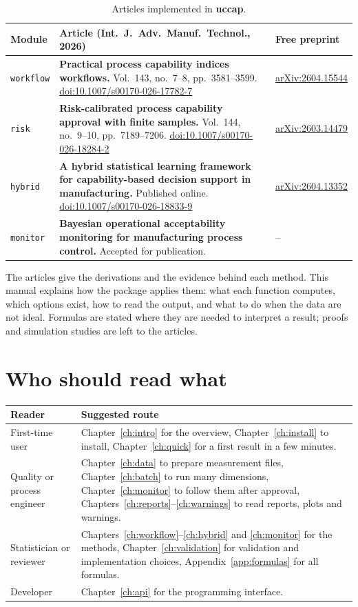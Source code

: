 \documentclass[a4paper,11pt,oneside,openany,parskip=half-,headings=standardclasses,toc=flat,numbers=noenddot]{scrbook}
\newcommand{\thead}[1]{{\sffamily\bfseries\footnotesize #1}}
\newcommand{\code}[1]{\texttt{\begingroup\def\_{\textunderscore\allowbreak}#1\endgroup}}
\newcommand{\pkg}{\textsf{\bfseries uccap}}
\newcommand{\doi}[1]{\href{https://doi.org/#1}{doi:#1}}
\newcommand{\arxiv}[1]{\href{https://arxiv.org/abs/#1}{arXiv:#1}}
\newcommand{\chapref}[1]{Chapter~\ref{#1}}
\begin{document}
\begin{table}[!htp]
\caption{Articles implemented in \pkg{}.}\label{tab:papers}
\small
\begin{tabularx}{\textwidth}{@{}P{14mm}L p{31mm}@{}}
\toprule
\thead{Module} & \thead{Article (Int.\ J.\ Adv.\ Manuf.\ Technol., 2026)} & \thead{Free preprint}\\
\midrule
\code{workflow} & \textbf{Practical process capability indices workflows.}
  Vol.\ 143, no.\ 7--8, pp.\ 3581--3599. \doi{10.1007/s00170-026-17782-7} & \arxiv{2604.15544}\\
\addlinespace
\code{risk} & \textbf{Risk-calibrated process capability approval with finite samples.}
  Vol.\ 144, no.\ 9--10, pp.\ 7189--7206. \doi{10.1007/s00170-026-18284-2} & \arxiv{2603.14479}\\
\addlinespace
\code{hybrid} & \textbf{A hybrid statistical learning framework for capability-based decision support
  in manufacturing.} Published online. \doi{10.1007/s00170-026-18833-9} & \arxiv{2604.13352}\\
\addlinespace
\code{monitor} & \textbf{Bayesian operational acceptability monitoring for manufacturing process control.}
  Accepted for publication. & --\\
\bottomrule
\end{tabularx}
\end{table}

The articles give the derivations and the evidence behind each method. This manual explains how
the package applies them: what each function computes, which options exist, how to read the
output, and what to do when the data are not ideal. Formulas are stated where they are needed to
interpret a result; proofs and simulation studies are left to the articles.

\section*{Who should read what}

\begin{table}[!htp]
\small
\begin{tabularx}{\textwidth}{@{}P{36mm}L@{}}
\toprule
\thead{Reader} & \thead{Suggested route}\\
\midrule
First-time user & \chapref{ch:intro} for the overview, \chapref{ch:install} to install, \chapref{ch:quick} for a first result in a few minutes.\\
Quality or process engineer & \chapref{ch:data} to prepare measurement files, \chapref{ch:batch} to run many dimensions, \chapref{ch:monitor} to follow them after approval, Chapters~\ref{ch:reports}--\ref{ch:warnings} to read reports, plots and warnings.\\
Statistician or reviewer & Chapters~\ref{ch:workflow}--\ref{ch:hybrid} and \ref{ch:monitor} for the methods, \chapref{ch:validation} for validation and implementation choices, Appendix~\ref{app:formulas} for all formulas.\\
Developer & \chapref{ch:api} for the programming interface.\\
\bottomrule
\end{tabularx}
\end{table}
\end{document}
